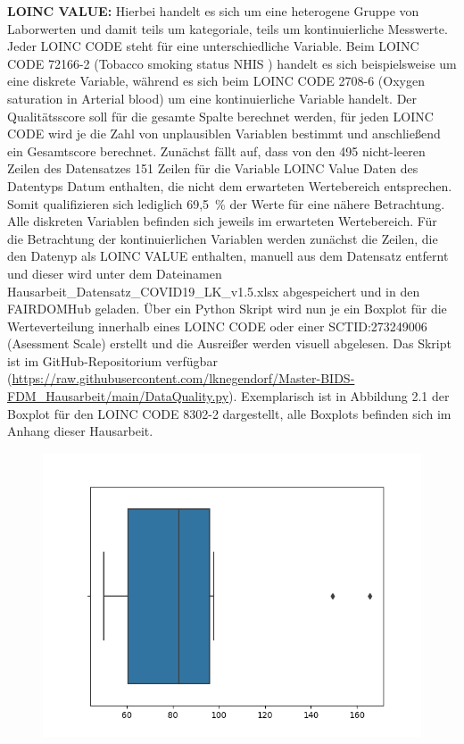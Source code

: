 \documentclass[12pt,a4paper,toc=bibliographynumbered,toc=indenttextentries]{scrreprt}
\begin{document}
\begin{description}
			\textbf{LOINC VALUE:} Hierbei handelt es sich um eine heterogene Gruppe von Laborwerten und damit teils um kategoriale, teils um kontinuierliche Messwerte. Jeder LOINC CODE steht für eine unterschiedliche Variable. Beim LOINC CODE 72166-2 (Tobacco smoking status NHIS
			) handelt es sich beispielsweise um eine diskrete Variable, während es sich beim LOINC CODE 2708-6 (Oxygen saturation in Arterial blood) um eine kontinuierliche Variable handelt.
			Der Qualitätsscore soll für die gesamte Spalte berechnet werden, für jeden LOINC CODE wird je die Zahl von unplausiblen Variablen bestimmt und anschließend ein Gesamtscore berechnet. Zunächst fällt auf, dass von den 495 nicht-leeren Zeilen des Datensatzes 151 Zeilen für die Variable LOINC Value Daten des Datentyps Datum enthalten, die nicht dem erwarteten Wertebereich entsprechen. Somit qualifizieren sich lediglich 69,5~\% der Werte für eine nähere Betrachtung. Alle diskreten Variablen befinden sich jeweils im erwarteten Wertebereich. Für die Betrachtung der kontinuierlichen Variablen werden zunächst die Zeilen, die den Datenyp als LOINC VALUE enthalten, manuell aus dem Datensatz entfernt und dieser wird unter dem Dateinamen \textsf{Hausarbeit\_Datensatz\_COVID19\_LK\_v1.5.xlsx} abgespeichert und in den FAIRDOMHub geladen. Über ein Python Skript wird nun je ein Boxplot für die Werteverteilung innerhalb eines LOINC CODE oder einer SCTID:273249006 (Asessment Scale) erstellt und die Ausreißer werden visuell abgelesen. Das Skript ist im GitHub-Repositorium verfügbar (\url{https://raw.githubusercontent.com/lknegendorf/Master-BIDS-FDM_Hausarbeit/main/DataQuality.py}). Exemplarisch ist in Abbildung 2.1 der Boxplot für den LOINC CODE 8302-2 dargestellt, alle Boxplots befinden sich im Anhang dieser Hausarbeit.
			\begin{figure}
				\includegraphics[width=15.5cm]{Graphs/8302-2.png}

\end{figure}
\end{description}
\end{document}
